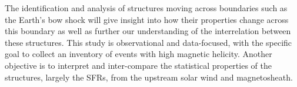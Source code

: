 The identification and analysis of structures moving across boundaries such as the Earth's bow shock will give insight into how their properties change across this boundary as well as further our understanding of the interrelation between these structures. This study is observational and data-focused, with the specific goal to collect an inventory of events with high magnetic helicity. Another objective is to interpret and inter-compare the statistical properties of the structures, largely the SFRs, from the upstream solar wind and magnetosheath.
